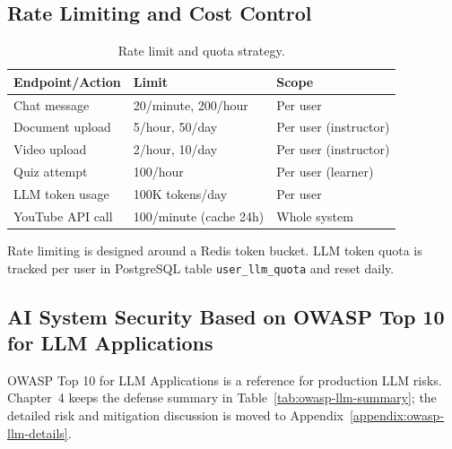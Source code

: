 \subsection{Rate Limiting and Cost Control}

\begin{table}[H]
    \centering
    \caption{Rate limit and quota strategy.}
    \label{tab:rate-limit}
    \begin{tabular}{|p{4cm}|p{4cm}|p{5cm}|}
        \hline
        \textbf{Endpoint/Action} & \textbf{Limit} & \textbf{Scope} \\
        \hline
        Chat message
            & 20/minute, 200/hour
            & Per user \\
        \hline
        Document upload
            & 5/hour, 50/day
            & Per user (instructor) \\
        \hline
        Video upload
            & 2/hour, 10/day
            & Per user (instructor) \\
        \hline
        Quiz attempt
            & 100/hour
            & Per user (learner) \\
        \hline
        LLM token usage
            & 100K tokens/day
            & Per user \\
        \hline
        YouTube API call
            & 100/minute (cache 24h)
            & Whole system \\
        \hline
    \end{tabular}
\end{table}

Rate limiting is designed around a Redis token bucket. LLM token quota
is tracked per user in PostgreSQL table \texttt{user\_llm\_quota} and
reset daily.

\subsection{AI System Security Based on OWASP Top 10 for LLM Applications}
\label{subsec:owasp-llm-summary}

OWASP Top 10 for LLM Applications is a reference for production LLM
risks. Chapter~4 keeps the defense summary in Table~\ref{tab:owasp-llm-summary};
the detailed risk and mitigation discussion is moved to
Appendix~\ref{appendix:owasp-llm-details}.

